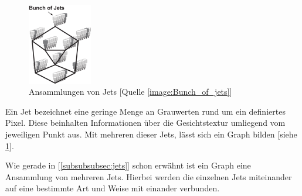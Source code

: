             \label{subsubsubsec:jets}
                \begin{figure}
                    \includegraphics[width=0.25\textwidth]{resources/images/img/Face recognition/Elastic Bunch Graph Matching - Bunch of Jets.png}
                    \caption{Ansammlungen von Jets [Quelle \ref{image:Bunch_of_jets}]}
                    \label{fig:bunch_of_jets}
                \end{figure}
                Ein Jet bezeichnet eine geringe Menge an Grauwerten rund um ein definiertes Pixel. Diese beinhalten Informationen über die Gesichtstextur umliegend vom jeweiligen Punkt aus. Mit mehreren dieser Jets, lässt sich ein Graph bilden [siehe \ref{fig:bunch_of_jets}].

            \label{subsubsubsec:Graphs}
                Wie gerade in [\ref{subsubsubsec:jets}] schon erwähnt ist ein Graph eine Ansammlung von mehreren Jets. Hierbei werden die einzelnen Jets miteinander auf eine bestimmte Art und Weise mit einander verbunden.